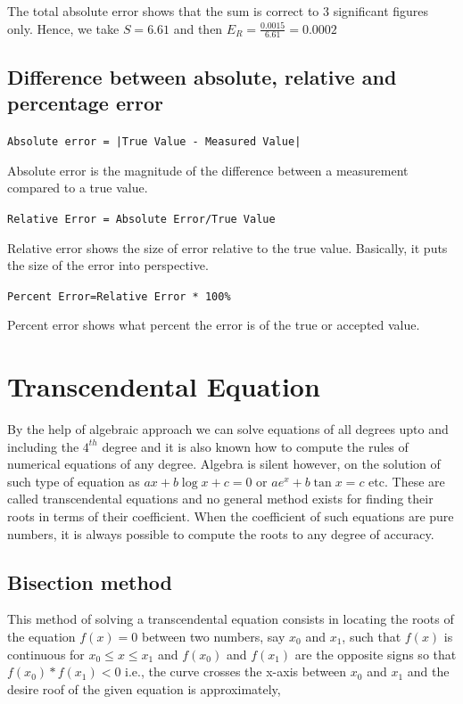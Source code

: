 \documentclass[11pt, a4paper, oneside]{book}
\begin{document}
              The total absolute error shows that the sum is correct to 3 significant figures only.
              Hence, we take $S=6.61$ and then $E_R=\frac{0.0015}{6.61}=0.0002$

          \subsection{Difference between absolute, relative and percentage error}
            \Large{\texttt{Absolute error = |True Value - Measured Value|}}

            Absolute error is the magnitude of the difference between a measurement
            compared to a true value.

            \noindent \Large{\texttt{Relative Error = Absolute Error/True Value}}

            Relative error shows the size of error relative to the true value. Basically,
            it puts the size of the error into perspective.

            \noindent \Large{\texttt{Percent Error=Relative Error * 100\%}}

            Percent error shows what percent the error is of the true or accepted value.


        \section{Transcendental Equation}
          By the help of algebraic approach we can solve equations of all degrees upto and
          including the $4^{th}$ degree and it is also known how to compute the rules of
          numerical equations of any degree. Algebra is silent however, on the solution of
          such type of equation as $ax+b\log{x}+c=0$ or $ae^x+b\tan{x}=c$ etc. These are
          called transcendental equations and no general method exists for finding their
          roots in terms of their coefficient. When the coefficient of such equations are
          pure numbers, it is always possible to compute the roots to any degree of accuracy.

          \subsection{Bisection method}
            This method of solving a transcendental equation consists in locating the roots
            of the equation $f(x)=0$ between two numbers, say $x_0$ and $x_1$, such that
            $f(x)$ is continuous for $x_0\leq x\leq x_1$ and $f(x_0)$ and $f(x_1)$ are the
            opposite signs so that $f(x_0)*f(x_1)<0$ i.e., the curve crosses the x-axis between
            $x_0$ and $x_1$ and the desire roof of the given equation is approximately,
\end{document}
